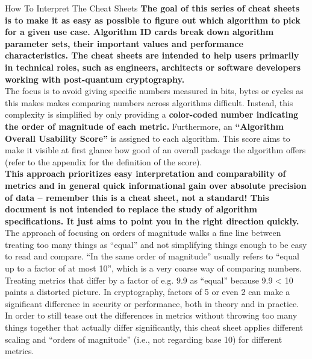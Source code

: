 \begin{minipage}[t]{0.58\textwidth} %
    \vspace{-3mm}
    \begin{algorithmbox}{How To Interpret The Cheat Sheets}
        \scriptsize
        {\bfseries The goal of this series of cheat sheets is to make it as easy as possible to figure out which algorithm to pick for a given use case. Algorithm ID cards break down algorithm parameter sets, their important values and performance characteristics. The cheat sheets are intended to help users primarily in technical roles, such as engineers, architects or software developers working with post-quantum cryptography.}\\[\baselineskip]

        The focus is to avoid giving specific numbers measured in bits, bytes or cycles as this makes makes comparing numbers across algorithms difficult. Instead, this complexity is simplified by only providing a
        {\bfseries color-coded number indicating the order of magnitude of each metric.} Furthermore, an {\bfseries ``Algorithm Overall Usability Score''} is assigned to each algorithm. This score aims to make it visible at first glance how good of an overall package the algorithm offers (refer to the appendix for the definition of the score).\\[\baselineskip]

        {\bfseries This approach prioritizes easy interpretation and comparability of metrics and in general quick informational gain over absolute precision of data -- remember this is a cheat sheet, not a standard! This document is not intended to replace the study of algorithm specifications. It just aims to point you in the right direction quickly.}\\[\baselineskip]

        The approach of focusing on orders of magnitude walks a fine line between treating too many things as ``equal'' and not simplifying things enough to be easy to read and compare. ``In the same order of magnitude'' usually refers to ``equal up to a factor of at most 10'', which is a very coarse way of comparing numbers. Treating metrics that differ by a factor of e.g. 9.9 as ``equal'' because 9.9 < 10 paints a distorted picture. In cryptography, factors of 5 or even 2 can make a significant difference in security or performance, both in theory and in practice. In order to still tease out the differences in metrics without throwing too many things together that actually differ significantly, this cheat sheet applies different scaling and ``orders of magnitude'' (i.e., not regarding base 10) for different metrics.\\[\baselineskip]



\end{algorithmbox}
\end{minipage}

